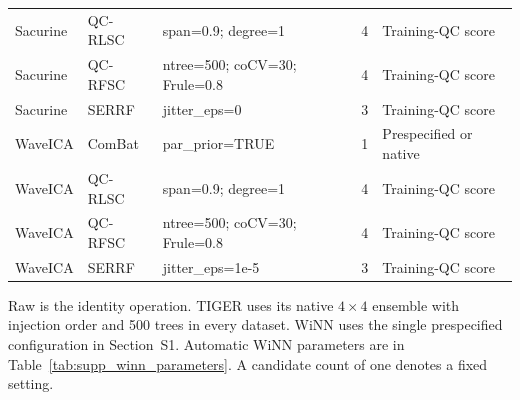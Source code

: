 \begin{landscape}
\begin{longtable}{p{2.8cm}p{1.6cm}p{8.0cm}rp{3.7cm}}
Sacurine & QC-RLSC & span=0.9; degree=1 & 4 & Training-QC score \\
Sacurine & QC-RFSC & ntree=500; coCV=30; Frule=0.8 & 4 & Training-QC score \\
Sacurine & SERRF & jitter\_eps=0 & 3 & Training-QC score \\
WaveICA & ComBat & par\_prior=TRUE & 1 & Prespecified or native \\
WaveICA & QC-RLSC & span=0.9; degree=1 & 4 & Training-QC score \\
WaveICA & QC-RFSC & ntree=500; coCV=30; Frule=0.8 & 4 & Training-QC score \\
WaveICA & SERRF & jitter\_eps=1e-5 & 3 & Training-QC score \\
\end{longtable}
\noindent\footnotesize Raw is the identity operation. TIGER uses its native $4\times4$ ensemble with injection order and 500 trees in every dataset. WiNN uses the single prespecified configuration in Section~S1. Automatic WiNN parameters are in Table~\ref{tab:supp_winn_parameters}. A candidate count of one denotes a fixed setting.\par
\end{landscape}
